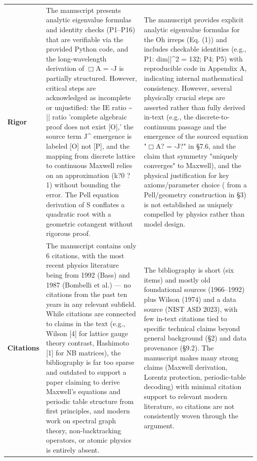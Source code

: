 \documentclass[11pt]{article}
\begin{document}
\begin{longtable}{@{} p{2.2cm} p{6.3cm} p{6.3cm} @{}}
\rowcolor{rowgray}
\textbf{Rigor} &
The manuscript presents analytic eigenvalue formulas and identity checks (P1--P16) that are verifiable via the provided Python code, and the long-wavelength derivation of $\Box$A = -J is partially structured. However, critical steps are acknowledged as incomplete or unjustified: the IE ratio \textasciitilde{} |\textlambda{}| ratio 'complete algebraic proof does not exist [O],' the source term J\textasciicircum{}\textmu{} emergence is labeled [O] not [P], and the mapping from discrete lattice to continuous Maxwell relies on an approximation (k?0 ? 1) without bounding the error. The Pell equation derivation of \textdelta{}S conflates a quadratic root with a geometric cotangent without rigorous proof. &
The manuscript provides explicit analytic eigenvalue formulas for the Oh irreps (Eq. (1)) and includes checkable identities (e.g., P1: \textSigma{} dim|\textlambda{}|\textasciicircum{}2 = 132; P4; P5) with reproducible code in Appendix A, indicating internal mathematical consistency. However, several physically crucial steps are asserted rather than fully derived in-text (e.g., the discrete-to-continuum passage and the emergence of the sourced equation "$\Box$A? = -J?" in \S{}7.6, and the claim that symmetry "uniquely converges" to Maxwell), and the physical justification for key axioms/parameter choice (\textxi{} from a Pell/geometry construction in \S{}3) is not established as uniquely compelled by physics rather than model design. \\[6pt]

\textbf{Citations} &
The manuscript contains only 6 citations, with the most recent physics literature being from 1992 (Bass) and 1987 (Bombelli et al.) --- no citations from the past ten years in any relevant subfield. While citations are connected to claims in the text (e.g., Wilson [4] for lattice gauge theory contrast, Hashimoto [1] for NB matrices), the bibliography is far too sparse and outdated to support a paper claiming to derive Maxwell's equations and periodic table structure from first principles, and modern work on spectral graph theory, non-backtracking operators, or atomic physics is entirely absent. &
The bibliography is short (six items) and mostly old foundational sources (1966--1992) plus Wilson (1974) and a data source (NIST ASD 2023), with few in-text citations tied to specific technical claims beyond general background (\S{}2) and data provenance (\S{}9.2). The manuscript makes many strong claims (Maxwell derivation, Lorentz protection, periodic-table decoding) with minimal citation support to relevant modern literature, so citations are not consistently woven through the argument. \\

\end{longtable}
\end{document}
